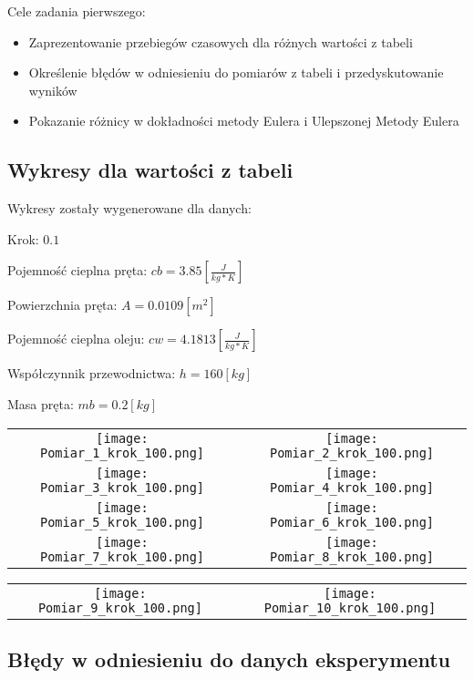\documentclass[varwidth,12pt,a4paper]{article}
\begin{document}
Cele zadania pierwszego:

\begin{itemize}
  \item Zaprezentowanie przebiegów czasowych dla różnych wartości z tabeli
  \item Określenie błędów w odniesieniu do pomiarów z tabeli i przedyskutowanie wyników
  \item Pokazanie różnicy w dokładności metody Eulera i Ulepszonej Metody Eulera
\end{itemize}

\subsection{Wykresy dla wartości z tabeli}

Wykresy zostały wygenerowane dla danych:

Krok: $0.1$

Pojemność cieplna pręta: $cb=3.85[\frac{J}{kg * K}]$ 

Powierzchnia pręta: $A=0.0109[m^2]$

Pojemność cieplna oleju: $cw=4.1813[\frac{J}{kg * K}]$

Współczynnik przewodnictwa: $h=160[kg]$

Masa pręta: $mb=0.2[kg]$

\begin{tabular}{cc}
    \texttt{[image: Pomiar\_1\_krok\_100.png]} &
    \texttt{[image: Pomiar\_2\_krok\_100.png]} \\
    \texttt{[image: Pomiar\_3\_krok\_100.png]} &
    \texttt{[image: Pomiar\_4\_krok\_100.png]} \\
    \texttt{[image: Pomiar\_5\_krok\_100.png]} &
    \texttt{[image: Pomiar\_6\_krok\_100.png]} \\
    \texttt{[image: Pomiar\_7\_krok\_100.png]} &
    \texttt{[image: Pomiar\_8\_krok\_100.png]} 
\end{tabular}

\begin{tabular}{cc}
    \texttt{[image: Pomiar\_9\_krok\_100.png]} &
    \texttt{[image: Pomiar\_10\_krok\_100.png]} 
\end{tabular}

\subsection{Błędy w odniesieniu do danych eksperymentu}
\end{document}
